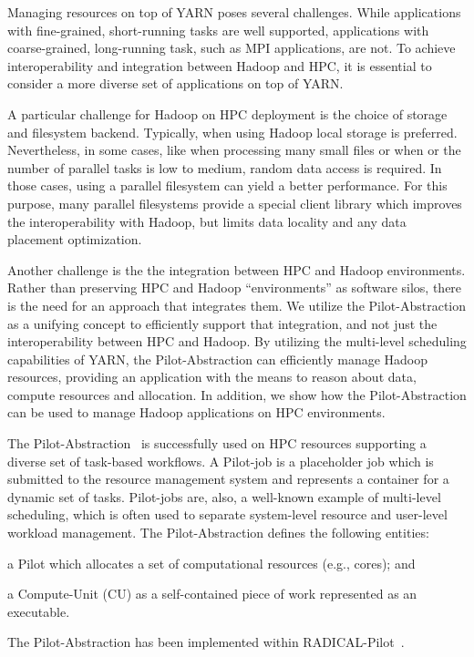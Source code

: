 Managing resources on top of YARN poses several challenges. While applications
with fine-grained, short-running tasks are well supported, applications with
coarse-grained, long-running task, such as MPI applications, are not. To achieve
interoperability and integration between Hadoop and HPC, it is essential to
consider a more diverse set of applications on top of YARN.

A particular challenge for Hadoop on HPC deployment is the choice of storage and
filesystem backend. Typically, when using Hadoop local storage is preferred.
Nevertheless, in some cases, like when processing many small files or when or
the number of parallel tasks is low to medium, random data access is required.
In those cases, using a parallel filesystem can yield a better performance. For
this purpose, many parallel filesystems provide a special client library which
improves the interoperability with Hadoop, but limits data locality and any data
placement optimization.

Another challenge is the the integration between HPC and Hadoop environments.
Rather than preserving HPC and Hadoop ``environments'' as software silos, there
is the need for an approach that integrates them. We utilize the
Pilot-Abstraction as a unifying concept to efficiently support that integration,
and not just the interoperability between HPC and Hadoop. By utilizing the
multi-level scheduling capabilities of YARN, the Pilot-Abstraction can
efficiently manage Hadoop resources, providing an application with the means to
reason about data, compute resources and allocation. In addition, we show how
the Pilot-Abstraction can be used to manage Hadoop applications on HPC
environments.

The Pilot-Abstraction~\cite{luckow2012pstar} is successfully used on HPC
resources supporting a diverse set of task-based workflows. A Pilot-job is a
placeholder job which is submitted to the resource management system and
represents a container for a dynamic set of tasks. Pilot-jobs are, also, a
well-known example of multi-level scheduling, which is often used to separate
system-level resource and user-level workload management. The Pilot-Abstraction
defines the following entities:
\begin{inparaenum} [1)]
    \item a Pilot which allocates a set of computational resources (e.g.,
    cores); and
    \item  a Compute-Unit (CU) as a self-contained piece of work represented as
    an executable.
\end{inparaenum}
The Pilot-Abstraction has been implemented within
RADICAL-Pilot~\cite{merzky2018design}.



